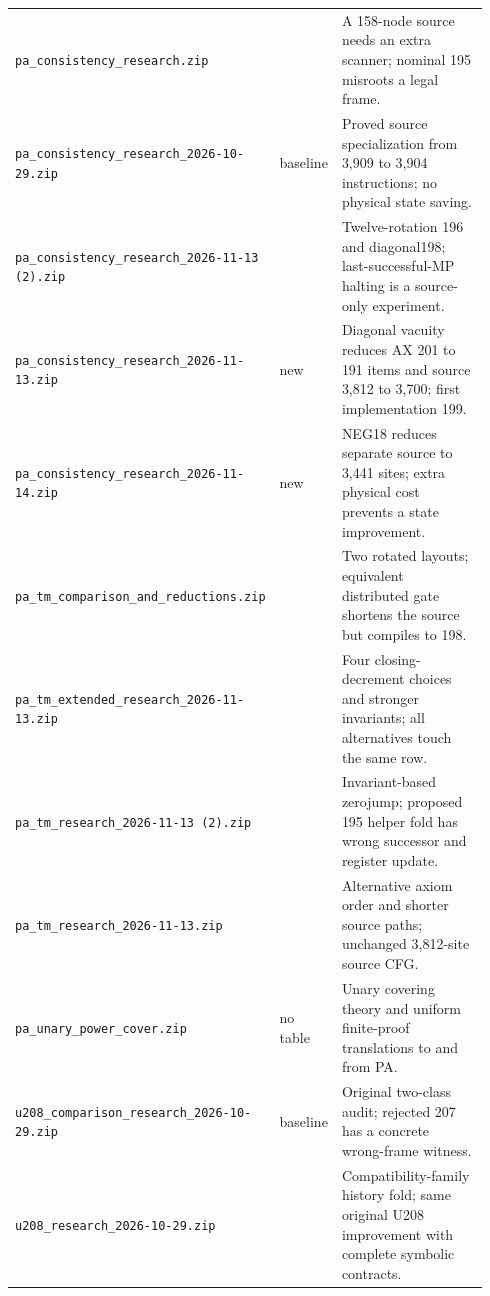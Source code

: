 \begin{longtable}{@{}>{\raggedright\arraybackslash}p{0.37\linewidth}>{\raggedright\arraybackslash}p{0.12\linewidth}>{\raggedright\arraybackslash}p{0.45\linewidth}@{}}
\nolinkurl{pa_consistency_research.zip} & 196 & A 158-node source needs an extra scanner; nominal 195 misroots a legal frame.\\[3pt]
\nolinkurl{pa_consistency_research_2026-10-29.zip} & 208 baseline & Proved source specialization from 3,909 to 3,904 instructions; no physical state saving.\\[3pt]
\nolinkurl{pa_consistency_research_2026-11-13 (2).zip} & 196 & Twelve-rotation 196 and diagonal198; last-successful-MP halting is a source-only experiment.\\[3pt]
\nolinkurl{pa_consistency_research_2026-11-13.zip} & 199 new & Diagonal vacuity reduces AX 201 to 191 items and source 3,812 to 3,700; first implementation 199.\\[3pt]
\nolinkurl{pa_consistency_research_2026-11-14.zip} & 197 new & NEG18 reduces separate source to 3,441 sites; extra physical cost prevents a state improvement.\\[3pt]
\nolinkurl{pa_tm_comparison_and_reductions.zip} & 196 & Two rotated layouts; equivalent distributed gate shortens the source but compiles to 198.\\[3pt]
\nolinkurl{pa_tm_extended_research_2026-11-13.zip} & 196 & Four closing-decrement choices and stronger invariants; all alternatives touch the same row.\\[3pt]
\nolinkurl{pa_tm_research_2026-11-13 (2).zip} & 196 & Invariant-based zerojump; proposed 195 helper fold has wrong successor and register update.\\[3pt]
\nolinkurl{pa_tm_research_2026-11-13.zip} & 196 & Alternative axiom order and shorter source paths; unchanged 3,812-site source CFG.\\[3pt]
\nolinkurl{pa_unary_power_cover.zip} & no table & Unary covering theory and uniform finite-proof translations to and from PA.\\[3pt]
\nolinkurl{u208_comparison_research_2026-10-29.zip} & 208 baseline & Original two-class audit; rejected 207 has a concrete wrong-frame witness.\\[3pt]
\nolinkurl{u208_research_2026-10-29.zip} & 208 & Compatibility-family history fold; same original U208 improvement with complete symbolic contracts.\\[3pt]
\end{longtable}
\endgroup
